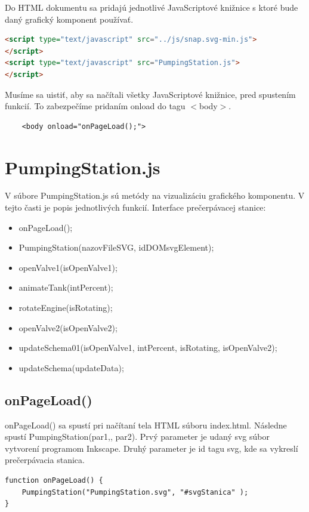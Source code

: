 Do HTML dokumentu sa pridajú jednotlivé JavaScriptové knižnice s ktoré bude daný grafický komponent používať. 
\begin{lstlisting}[language = HTML]
<script type="text/javascript" src="../js/snap.svg-min.js">
</script>
<script type="text/javascript" src="PumpingStation.js">
</script>
\end{lstlisting}

Musíme sa uistiť, aby sa načítali všetky JavaScriptové knižnice, pred spustením funkcií. To zabezpečíme pridaním  onload do tagu $<$body$>$. 
\begin{lstlisting}
	<body onload="onPageLoad();">
\end{lstlisting}



\section{PumpingStation.js}
V súbore PumpingStation.js sú metódy na vizualizáciu grafického komponentu. V tejto časti je popis jednotlivých funkcií. 
Interface prečerpávacej stanice: 
\begin{itemize}
	\item onPageLoad();
	\item PumpingStation(nazovFileSVG, idDOMsvgElement);
    \item openValve1(isOpenValve1);
    \item animateTank(intPercent);
    \item rotateEngine(isRotating);
    \item openValve2(isOpenValve2);
    \item updateSchema01(isOpenValve1, intPercent, isRotating, isOpenValve2);
    \item updateSchema(updateData);
\end{itemize}

\subsection{onPageLoad()}
onPageLoad() sa spustí pri načítaní tela HTML súboru index.html. Následne spustí  PumpingStation(par1,, par2). Prvý parameter je udaný svg súbor vytvorení programom Inkscape. Druhý parameter je id tagu svg, kde sa vykreslí prečerpávacia stanica.

\begin{lstlisting}
function onPageLoad() {
	PumpingStation("PumpingStation.svg", "#svgStanica" );
}
\end{lstlisting}

